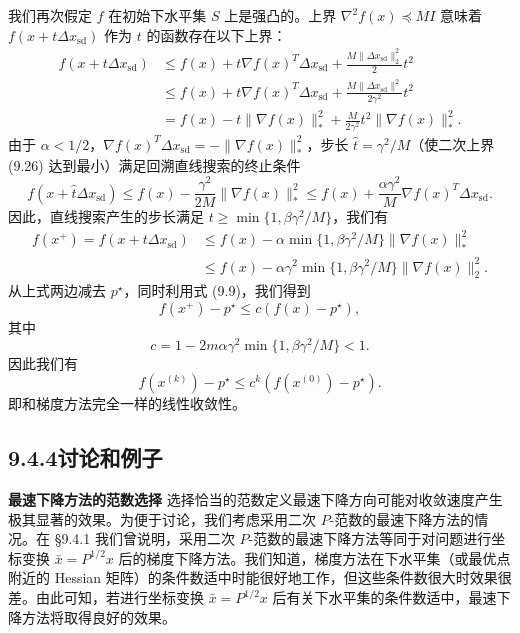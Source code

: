 \documentclass[UTF8,12pt,a4paper,fontset=fandol]{ctexart}
\begin{document}
我们再次假定 $f$ 在初始下水平集 $S$ 上是强凸的。上界 $\nabla^2 f(x)\preceq MI$ 意味着 $f(x+t\Delta x_{\mathrm{sd}})$ 作为 $t$ 的函数存在以下上界：
\begin{equation}
\begin{aligned}
f(x+t\Delta x_{\mathrm{sd}})
&\leq f(x)+t\nabla f(x)^T\Delta x_{\mathrm{sd}}+\frac{M\|\Delta x_{\mathrm{sd}}\|_2^2}{2}t^2\\
&\leq f(x)+t\nabla f(x)^T\Delta x_{\mathrm{sd}}+\frac{M\|\Delta x_{\mathrm{sd}}\|^2}{2\gamma^2}t^2\\
&=f(x)-t\|\nabla f(x)\|_\ast^2+\frac{M}{2\gamma^2}t^2\|\nabla f(x)\|_\ast^2.
\end{aligned}
\tag{9.26}
\end{equation}
由于 $\alpha<1/2$，$\nabla f(x)^T\Delta x_{\mathrm{sd}}=-\|\nabla f(x)\|_\ast^2$，步长 $\hat{t}=\gamma^2/M$（使二次上界 (9.26) 达到最小）满足回溯直线搜索的终止条件
\begin{equation}
f(x+\hat{t}\Delta x_{\mathrm{sd}})\leq f(x)-\frac{\gamma^2}{2M}\|\nabla f(x)\|_\ast^2
\leq f(x)+\frac{\alpha\gamma^2}{M}\nabla f(x)^T\Delta x_{\mathrm{sd}}.
\tag{9.27}
\end{equation}
因此，直线搜索产生的步长满足 $t\geq\min\{1,\beta\gamma^2/M\}$，我们有
\[
\begin{aligned}
f(x^+)=f(x+t\Delta x_{\mathrm{sd}})
&\leq f(x)-\alpha\min\{1,\beta\gamma^2/M\}\|\nabla f(x)\|_\ast^2\\
&\leq f(x)-\alpha\gamma^2\min\{1,\beta\gamma^2/M\}\|\nabla f(x)\|_2^2.
\end{aligned}
\]
从上式两边减去 $p^\star$，同时利用式 (9.9)，我们得到
\[
f(x^+)-p^\star\leq c(f(x)-p^\star),
\]
其中
\[
c=1-2m\alpha\gamma^2\min\{1,\beta\gamma^2/M\}<1.
\]
因此我们有
\[
f(x^{(k)})-p^\star\leq c^k(f(x^{(0)})-p^\star).
\]
即和梯度方法完全一样的线性收敛性。

\subsection*{9.4.4\quad 讨论和例子}

\noindent\textbf{最速下降方法的范数选择}\quad
选择恰当的范数定义最速下降方向可能对收敛速度产生极其显著的效果。为便于讨论，我们考虑采用二次 $P$-范数的最速下降方法的情况。在 \S9.4.1 我们曾说明，采用二次 $P$-范数的最速下降方法等同于对问题进行坐标变换 $\bar{x}=P^{1/2}x$ 后的梯度下降方法。我们知道，梯度方法在下水平集（或最优点附近的 Hessian 矩阵）的条件数适中时能很好地工作，但这些条件数很大时效果很差。由此可知，若进行坐标变换 $\bar{x}=P^{1/2}x$ 后有关下水平集的条件数适中，最速下降方法将取得良好的效果。
\end{document}

